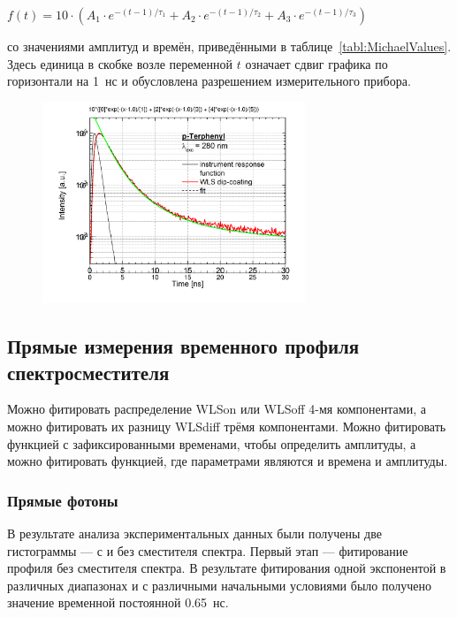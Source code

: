 {\centering
$ f(t) = 10 \cdot ( A_{1} \cdot e^{-(t-1) / \tau_{1}} + A_{2} \cdot e^{-(t-1) / \tau_{2}} + A_{3} \cdot e^{-(t-1) / \tau_{3}} ) $ \\
}

со значениями амплитуд и времён, приведёнными в таблице~\ref{tabl:MichaelValues}. Здесь единица в скобке возле переменной $ t $ означает сдвиг графика по горизонтали на 1~нс и обусловлена разрешением измерительного прибора.

\begin{figure}[H]
\includegraphics[width=0.7\textwidth]{pictures/FluoroFitting_shift_1ns_2.png}
\caption{}
\label{fig:MichaelProfileFit}
\end{figure}


\subsection{Прямые измерения временного профиля\\ спектросместителя}

Можно фитировать распределение WLS\textunderscore on или WLS\textunderscore off 4-мя компонентами, а можно фитировать их разницу WLS\textunderscore diff трёмя компонентами. Можно фитировать функцией с зафиксированными временами, чтобы определить амплитуды, а можно фитировать функцией, где параметрами являются и времена и амплитуды.

\subsubsection{Прямые фотоны}

В результате анализа экспериментальных данных были получены две гистограммы --- с и без сместителя спектра. Первый этап --- фитирование профиля без сместителя спектра. В результате фитирования одной экспонентой в различных диапазонах и с различными начальными условиями было получено значение временной постоянной 0.65~нс.


